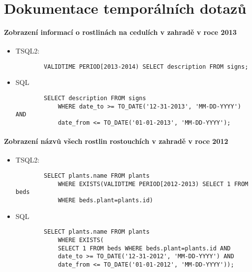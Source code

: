 \documentclass[12pt,a4paper]{article}
\begin{document}
\section*{Dokumentace temporálních dotazů}

\paragraph*{Zobrazení informací o rostlinách na cedulích v zahradě v roce 2013}
\begin{itemize}

	\item
	TSQL2:
		\begin{verbatim}
		VALIDTIME PERIOD[2013-2014) SELECT description FROM signs;
		\end{verbatim}
	\item
	SQL
		\begin{verbatim}
		SELECT description FROM signs
			WHERE date_to >= TO_DATE('12-31-2013', 'MM-DD-YYYY') AND
			date_from <= TO_DATE('01-01-2013', 'MM-DD-YYYY');
		\end{verbatim}

\end{itemize}

\paragraph*{Zobrazení názvů všech rostlin rostouchích v zahradě v roce 2012}
\begin{itemize}

	\item
	TSQL2:
		\begin{verbatim}
		SELECT plants.name FROM plants 
			WHERE EXISTS(VALIDTIME PERIOD[2012-2013) SELECT 1 FROM beds 
			WHERE beds.plant=plants.id)
		\end{verbatim}
	\item
	SQL
		\begin{verbatim}
		SELECT plants.name FROM plants
			WHERE EXISTS(
    		SELECT 1 FROM beds WHERE beds.plant=plants.id AND
    		date_to >= TO_DATE('12-31-2012', 'MM-DD-YYYY') AND
    		date_from <= TO_DATE('01-01-2012', 'MM-DD-YYYY'));
		\end{verbatim}

\end{itemize}
\end{document}
